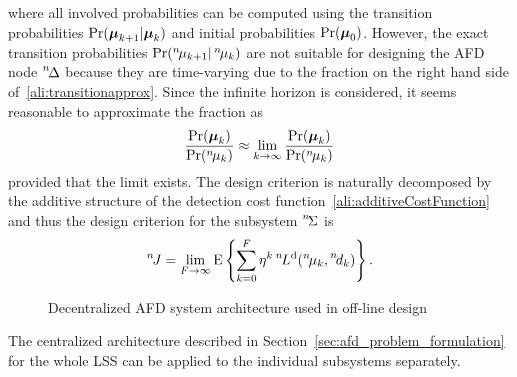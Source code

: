 \documentclass[conference,10pt]{IEEEtran}
\def\ist{\prescript{1\!}{}}
\def\iind{\prescript{2\!}{}}
\def\iiird{\prescript{3\!}{}}
\def\nth{\prescript{n\!}{}}
\begin{document}
where all involved probabilities can be computed using the transition probabilities $\Pr(\boldsymbol{\mu}_{k+1}|\boldsymbol{\mu}_k)$ and initial probabilities $\Pr(\boldsymbol{\mu}_{0})$. 
However, the exact transition probabilities  $\Pr(\nth{\mu}_{k+1}|\nth{\mu}_k)$ are not suitable for designing the AFD node $\nth{\Delta}$ because they are time-varying due to the fraction on the right hand side of~\eqref{ali:transitionapprox}. 
Since the infinite horizon is considered, it seems reasonable to approximate the fraction as
\begin{align}
	\label{ali:coupling_ignorance}
	\frac{\Pr(\bfmu_k)}{\Pr(\nth{\mu}_k)}\approx \lim_{k\to\infty} \frac{\Pr(\bfmu_k)}{\Pr(\nth{\mu}_k)}
\end{align}
provided that the limit exists. 
The design criterion is naturally decomposed by the additive structure of the detection cost function~\eqref{ali:additiveCostFunction} and thus the design criterion for the subsystem $\nth{\Sigma}$ is
\begin{align}
	\nth{J} = \lim_{F\to\infty} \mean \left\{ \sum_{k=0}^{F} \eta^{k} \nth{L}^{\mathrm{d}}(\nth{\mu}_{k},\nth{d}_{k})\right\}.
\end{align}
\begin{figure}[ht]
  \centering
  \caption{Decentralized AFD system architecture used in off-line design}\label{fig:DeAFD}
\end{figure}
The centralized architecture described in Section~\ref{sec:afd_problem_formulation} for the whole LSS can be applied to the individual subsystems separately. 
\end{document}
